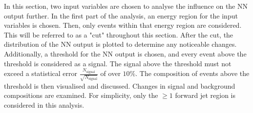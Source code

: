 In this section, two input variables are chosen to analyse the influence on the NN output further. In the first part of the analysis, an energy region for the input variables is chosen. Then, only events within that energy region are considered. This will be referred to as a "cut" throughout this section. 
After the cut, the distribution of the NN output is plotted to determine any noticeable changes. Additionally, a threshold for the NN output is chosen, and every event above the threshold is considered as a signal. The signal above the threshold must not exceed a statistical error $\frac{N_\text{signal}}{\sqrt{N_\text{signal}}}$ of over $10\%$. 
The composition of events above the threshold is then visualised and discussed. Changes in signal and background compositions are examined. For simplicity, only the $\geq 1$ forward jet region is considered in this analysis.

